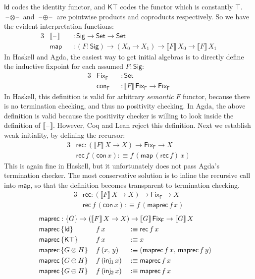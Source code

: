 \documentclass[12pt,a4paper,twoside,openany]{book}
\theoremstyle{remark}
\theoremstyle{definition}
\newcommand{\ms}[1]{\mathsf{#1}}
\newcommand{\Id}{\mathsf{Id}}
\newcommand{\blank}{\mathord{\hspace{1pt}\text{--}\hspace{1pt}}}
\newcommand{\Set}{\mathsf{Set}}
\newcommand{\defn}{:\equiv}
\begin{document}
$\ms{Id}$ codes the identity functor, and $\ms{K\top}$ codes the functor which
is constantly $\top$. $\blank\!\otimes\!\blank$ and $\blank\!\oplus\!\blank$ are
pointwise products and coproducts respectively. So we have the evident
interpretation functions:
\begin{alignat*}{3}
  & \llbracket\blank\rrbracket &&: \ms{Sig} \to \Set \to \Set\\
  & \ms{map} &&: (F : \ms{Sig}) \to (X_0 \to X_1) \to \llbracket F \rrbracket\,X_0 \to \llbracket F \rrbracket\,X_1
\end{alignat*}
In Haskell and Agda, the easiest way to get initial algebras is to directly define
the inductive fixpoint for each assumed $F : \ms{Sig}$:
\begin{alignat*}{3}
  & \ms{Fix_F} &&: \Set \\
  & \ms{con_F} &&: \llbracket F \rrbracket\,\ms{Fix_F} \to \ms{Fix_F}
\end{alignat*}
In Haskell, this definition is valid for arbitrary \emph{semantic} $F$ functor,
because there is no termination checking, and thus no positivity checking. In
Agda, the above definition is valid because the positivity checker is willing to
look inside the definition of $\llbracket\blank\rrbracket$. However, Coq and
Lean reject this definition. Next we establish weak initiality, by defining the
recursor:
\begin{alignat*}{3}
  & \ms{rec} : (\llbracket F \rrbracket\,X \to X) \to \ms{Fix_F} \to X \\
  & \ms{rec}\,f\,(\ms{con}\,x) \defn f\,(\ms{map}\,(\ms{rec}\,f)\,x)
\end{alignat*}
This is again fine in Haskell, but it unfortunately does not pass Agda's
termination checker. The most conservative solution is to inline the recursive
call into $\ms{map}$, so that the definition becomes transparent to termination
checking.
\begin{alignat*}{3}
  &\ms{rec} : (\llbracket F \rrbracket\,X \to X) \to \ms{Fix_F} \to X\\
  &\ms{rec}\,f\,(\ms{con}\,x) \defn f\,(\ms{maprec}\,f\,x)
\end{alignat*}
\begin{alignat*}{3}
  & \rlap{$\ms{maprec} : \{G\} \to (\llbracket F \rrbracket\,X \to X) \to \llbracket G \rrbracket\,\ms{Fix_F} \to \llbracket G \rrbracket\,X$}\\
  & \ms{maprec}\,\{\Id\}\,&&f\,x &&\defn \ms{rec}\,f\,x\\
  & \ms{maprec}\,\{\ms{K\top}\}\,&&f\,x &&\defn x\\
  & \ms{maprec}\,\{G \otimes H\}\,&&f\,(x,\,y) &&\defn  (\ms{maprec}\,f\,x,\,\ms{maprec}\,f\,y)\\
  & \ms{maprec}\,\{G \oplus H\}\,&&f\,(\ms{inj_1}\,x) &&\defn \ms{maprec}\,f\,x\\
  & \ms{maprec}\,\{G \oplus H\}\,&&f\,(\ms{inj_2}\,x) &&\defn \ms{maprec}\,f\,x
\end{alignat*}
\end{document}
